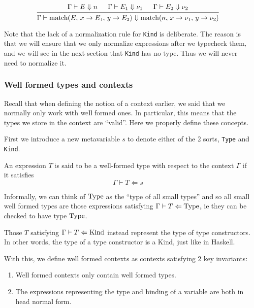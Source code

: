 \documentclass{article}
\begin{document}
\begin{enumerate}
  \[
   \begin{prooftree}
    \hypo{\Gamma \vdash E \Downarrow n}
      \hypo{\Gamma \vdash E_1 \Downarrow \nu_1}
      \hypo{\Gamma \vdash E_2 \Downarrow \nu_2}
      \infer3{\Gamma \vdash \match(E, \, x \rightarrow E_1, \, y \rightarrow E_2) 
               \Downarrow
               \match(n, \, x \rightarrow \nu_1, \, y \rightarrow \nu_2) 
               }
   \end{prooftree}  
  \]

\end{enumerate}

Note that the lack of a normalization rule for \verb|Kind| is deliberate.
The reason is that we will ensure that we only normalize expressions after we
typecheck them, and we will see in the next section that \verb|Kind| has no
type. Thus we will never need to normalize it.

\subsubsection{Well formed types and contexts}
Recall that when defining the notion of a context earlier, we said that we
normally only work with well formed ones. In particular, this means that the
types we store in the context are ``valid''. Here we properly define these
concepts.

First we introduce a new metavariable $s$ to denote either of the 2 sorts,
\verb|Type| and \verb|Kind|. 

\begin{definition} 
  An expression $T$ is said to be a well-formed type with respect to the context
  $\Gamma$ if it satisfies
  \[ \Gamma \vdash T \Leftarrow s \]

  Informally, we can think of $\operatorname{Type}$ as the ``type of all small types'' and so
  all small well formed types are those expressions satisfying
  $\Gamma \vdash T \Leftarrow \operatorname{Type}$, ie they can be checked to have type $\operatorname{Type}$.

  Those $T$ satisfying $\Gamma \vdash T \Leftarrow \operatorname{Kind}$ instead represent the
  type of type constructors. In other words, the type of a type constructor is a
  Kind, just like in Haskell. 
\end{definition}

With this, we define well formed contexts as contexts satisfying 2 key invariants:
\begin{enumerate}
  \item Well formed contexts only contain well formed types.
  \item The expressions representing the type and binding of a variable are both
  in head normal form.
\end{enumerate}
\end{document}
